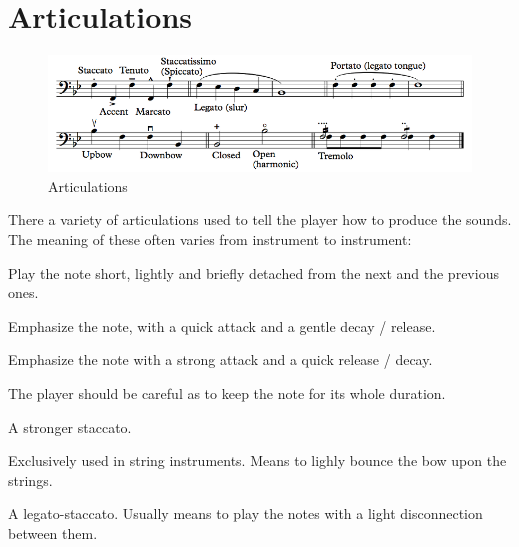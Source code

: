 \section{Articulations}
\begin{figure}[h]
    \begin{center}
        \includegraphics[width=1\textwidth]{img/articulations}
        \caption{Articulations}
    \end{center}
\end{figure}
There a variety of articulations used to tell the player how to produce the sounds. The meaning of these often varies from instrument to instrument:

\begin{definition}[Staccato]
    Play the note short, lightly and briefly detached from the next and the previous ones.
\end{definition}

\begin{definition}[Accent]
    Emphasize the note, with a quick attack and a gentle decay / release.
\end{definition}

\begin{definition}[Marcato]
    Emphasize the note with a strong attack and a quick release / decay.
\end{definition}

\begin{definition}[Tenuto]
    The player should be careful as to keep the note for its whole duration.
\end{definition}

\begin{definition}[Staccatissimo]
    A stronger staccato.
\end{definition}

\begin{definition}[Spiccato]
    Exclusively used in string instruments. Means to lighly bounce the bow upon the strings.
\end{definition}

\begin{definition}[Portato]
    A legato-staccato. Usually means to play the notes with a light disconnection between them.
\end{definition}

